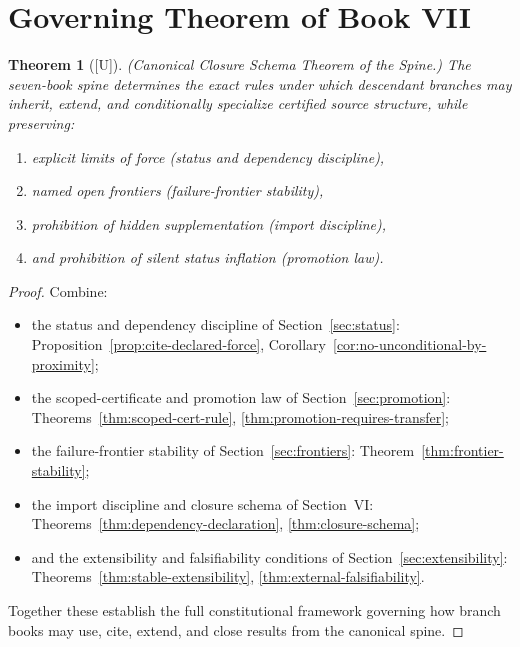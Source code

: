 \documentclass[12pt,oneside]{amsbook}
\theoremstyle{plain}
\newtheorem{theorem}{Theorem}[section]
\theoremstyle{definition}
\theoremstyle{remark}
\newcommand{\status}[1]{\textup{[#1]}}
\begin{document}
\section{Governing Theorem of Book VII}

\begin{theorem}[\status{U}]\label{thm:governing}
\textup{(Canonical Closure Schema Theorem of the Spine.)}  The
seven-book spine determines the exact rules under which descendant
branches may inherit, extend, and conditionally specialize certified
source structure, while preserving:
\begin{enumerate}[label=\textup{(\arabic*)}]
  \item explicit limits of force (status and dependency discipline),
  \item named open frontiers (failure-frontier stability),
  \item prohibition of hidden supplementation (import discipline),
  \item and prohibition of silent status inflation (promotion law).
\end{enumerate}
\end{theorem}

\begin{proof}
Combine:
\begin{itemize}
  \item the status and dependency discipline of Section~\ref{sec:status}:
        Proposition~\ref{prop:cite-declared-force},
        Corollary~\ref{cor:no-unconditional-by-proximity};
  \item the scoped-certificate and promotion law of
        Section~\ref{sec:promotion}:
        Theorems~\ref{thm:scoped-cert-rule},
        \ref{thm:promotion-requires-transfer};
  \item the failure-frontier stability of Section~\ref{sec:frontiers}:
        Theorem~\ref{thm:frontier-stability};
  \item the import discipline and closure schema of Section~VI:
        Theorems~\ref{thm:dependency-declaration},
        \ref{thm:closure-schema};
  \item and the extensibility and falsifiability conditions of
        Section~\ref{sec:extensibility}:
        Theorems~\ref{thm:stable-extensibility},
        \ref{thm:external-falsifiability}.
\end{itemize}
Together these establish the full constitutional framework governing
how branch books may use, cite, extend, and close results from the
canonical spine.
\end{proof}
\end{document}
